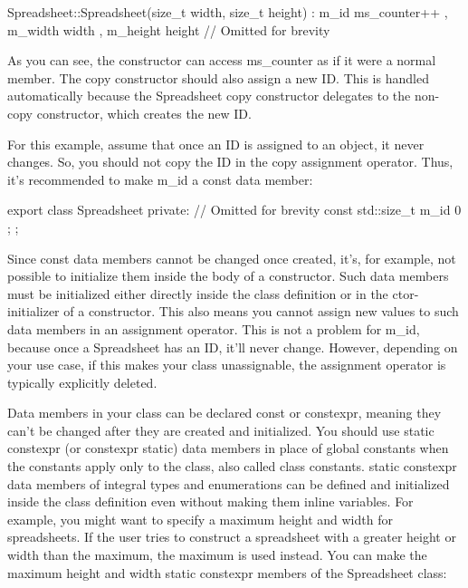 \begin{cpp}
Spreadsheet::Spreadsheet(size_t width, size_t height)
    : m_id { ms_counter++ }, m_width { width }, m_height { height }
{
    // Omitted for brevity
}
\end{cpp}

As you can see, the constructor can access ms\_counter as if it were a normal member. The copy constructor should also assign a new ID. This is handled automatically because the Spreadsheet copy constructor delegates to the non-copy constructor, which creates the new ID.

For this example, assume that once an ID is assigned to an object, it never changes. So, you should not copy the ID in the copy assignment operator. Thus, it’s recommended to make m\_id a const data member:

\begin{cpp}
export class Spreadsheet
{
    private:
        // Omitted for brevity
        const std::size_t m_id { 0 };
};
\end{cpp}

Since const data members cannot be changed once created, it’s, for example, not possible to initialize them inside the body of a constructor. Such data members must be initialized either directly inside the class definition or in the ctor-initializer of a constructor. This also means you cannot assign new values to such data members in an assignment operator. This is not a problem for m\_id, because once a Spreadsheet has an ID, it’ll never change. However, depending on your use case, if this makes your class unassignable, the assignment operator is typically explicitly deleted.


Data members in your class can be declared const or constexpr, meaning they can’t be changed after they are created and initialized. You should use static constexpr (or constexpr static) data members in place of global constants when the constants apply only to the class, also called class constants. static constexpr data members of integral types and enumerations can be defined and initialized inside the class definition even without making them inline variables. For example, you might want to specify a maximum height and width for spreadsheets. If the user tries to construct a spreadsheet with a greater height or width than the maximum, the maximum is used instead. You can make the maximum height and width static constexpr members of the Spreadsheet class:

